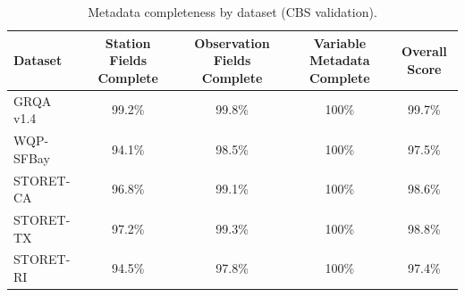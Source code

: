 \begin{table}
\caption{Metadata completeness by dataset (CBS validation).}
\label{tab:metadata}
\begin{tabular}{lcccc}
\toprule
Dataset & Station Fields Complete & Observation Fields Complete & Variable Metadata Complete & Overall Score \\
\midrule
GRQA v1.4 & 99.2\% & 99.8\% & 100\% & 99.7\% \\
WQP-SFBay & 94.1\% & 98.5\% & 100\% & 97.5\% \\
STORET-CA & 96.8\% & 99.1\% & 100\% & 98.6\% \\
STORET-TX & 97.2\% & 99.3\% & 100\% & 98.8\% \\
STORET-RI & 94.5\% & 97.8\% & 100\% & 97.4\% \\
\bottomrule
\end{tabular}
\end{table}
